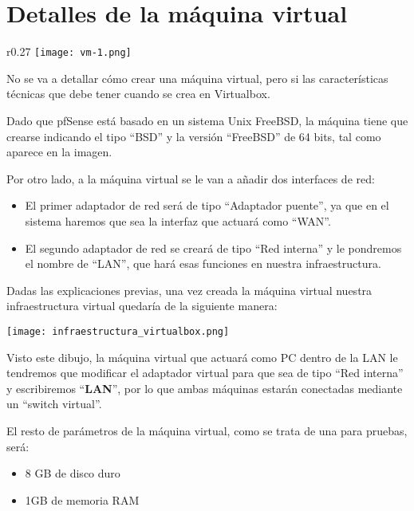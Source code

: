 \hypertarget{detalles_maquina_virtual}{}
\section{Detalles de la máquina virtual}
\begin{wrapfigure}{r}{0.27\linewidth}
    \centering
    \vspace{-20pt}
    \texttt{[image: vm-1.png]}
\end{wrapfigure}
No se va a detallar cómo crear una máquina virtual, pero si las características técnicas que debe tener cuando se crea en Virtualbox.

Dado que pfSense está basado en un sistema Unix FreeBSD, la máquina tiene que crearse indicando el tipo “BSD” y la versión “FreeBSD” de 64 bits, tal como aparece en la imagen.

Por otro lado, a la máquina virtual se le van a añadir dos interfaces de red:

\begin{itemize}
    \item El primer adaptador de red será de tipo “Adaptador puente”, ya que en el sistema haremos que sea la interfaz que actuará como “WAN”.
    \item El segundo adaptador de red se creará de tipo “Red interna” y le pondremos el nombre de “LAN”, que hará esas funciones en nuestra infraestructura.
\end{itemize}

Dadas las explicaciones previas, una vez creada la máquina virtual nuestra infraestructura virtual quedaría de la siguiente manera:

\begin{center}
    \vspace{-10pt}
    \texttt{[image: infraestructura\_virtualbox.png]}
    \vspace{-10pt}
\end{center}

Visto este dibujo, la máquina virtual que actuará como PC dentro de la LAN le tendremos que modificar el adaptador virtual para que sea de tipo “Red interna” y escribiremos “\textbf{LAN}”, por lo que ambas máquinas estarán conectadas mediante un “switch virtual”.

El resto de parámetros de la máquina virtual, como se trata de una para pruebas, será:

\begin{itemize}
    \item 8 GB de disco duro
    \item 1GB de memoria RAM
\end{itemize}

